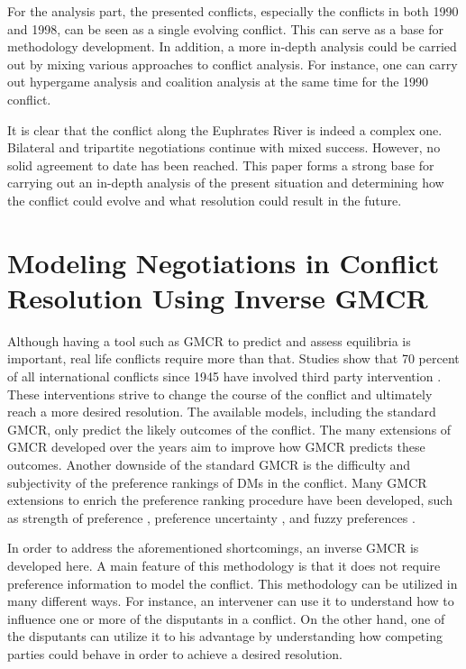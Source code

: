 \documentclass[letterpaper,12pt,titlepage,oneside,final]{book}
\begin{document}
For the analysis part, the presented conflicts, especially the conflicts in both 1990 and 1998, can be seen as a single evolving conflict. This can serve as a base for methodology development. In addition, a more in-depth analysis could be carried out by mixing various approaches to conflict analysis. For instance, one can carry out hypergame analysis and coalition analysis at the same time for the 1990 conflict.

It is clear that the conflict along the Euphrates River is indeed a complex one. Bilateral and tripartite negotiations continue with mixed success. However, no solid agreement to date has been reached. This paper forms a strong base for carrying out an in-depth analysis of the present situation and determining how the conflict could evolve and what resolution could result in the future. 



\chapter{Modeling Negotiations in Conflict Resolution Using Inverse GMCR}


Although having a tool such as GMCR to predict and assess equilibria is important, real life conflicts require more than that.  Studies show that 70 percent of all international conflicts since 1945 have involved third party intervention \cite{bercovitch2006}. These interventions strive to change the course of the conflict and ultimately reach a more desired resolution. The available models, including the standard GMCR, only predict the likely outcomes of the conflict. The many extensions of GMCR developed over the years aim to improve how GMCR predicts these outcomes. Another downside of the standard GMCR is the difficulty and subjectivity of the preference rankings of DMs in the conflict. Many GMCR extensions to enrich the preference ranking procedure have been developed, such as strength of preference \cite{hamouda2004strength,hamouda2006strength}, preference uncertainty \cite{li2004}, and fuzzy preferences \cite{bashar2012fuzzy,hipel2011fuzzy}.

In order to address the aforementioned shortcomings, an inverse GMCR is developed here. A main feature of this methodology is that it does not require preference information to model the conflict. This methodology can be utilized in many different  ways. For instance, an intervener can use it to understand how to influence one or more of the disputants in a conflict. On the other hand, one of the disputants can  utilize it to his advantage by understanding how competing parties could behave in order to achieve a desired resolution.
\end{document}
